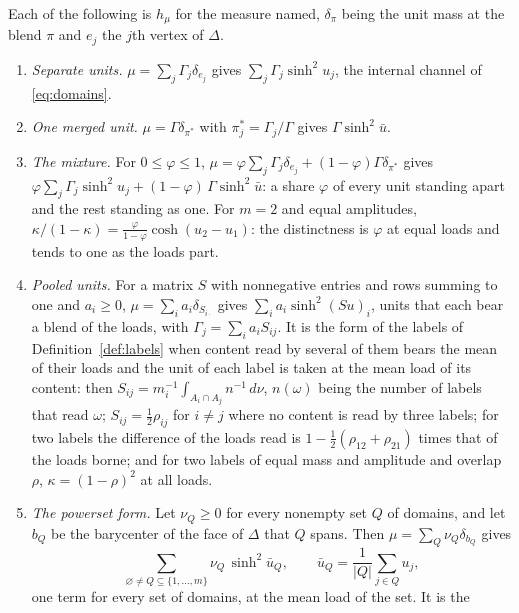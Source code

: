 \begin{proposition}\label{prop:forms}
Each of the following is $h_\mu$ for the measure named, $\delta_\pi$
being the unit mass at the blend $\pi$ and $e_j$ the $j$th vertex of
$\Delta$.
\begin{enumerate}[label=\emph{(\roman*)},itemsep=1pt]
\item \emph{Separate units.} $\mu=\sum_j\Gamma_j\delta_{e_j}$ gives
$\sum_j\Gamma_j\sinh^2u_j$, the internal channel of \eqref{eq:domains}.
\item \emph{One merged unit.} $\mu=\Gamma\delta_{\pi^\ast}$ with
$\pi^\ast_j=\Gamma_j/\Gamma$ gives $\Gamma\sinh^2\bar u$.
\item \emph{The mixture.} For $0\le\varphi\le1$,
$\mu=\varphi\sum_j\Gamma_j\delta_{e_j}+(1-\varphi)\Gamma\delta_{\pi^\ast}$
gives
$\varphi\sum_j\Gamma_j\sinh^2u_j+(1-\varphi)\,\Gamma\sinh^2\bar u$: a
share $\varphi$ of every unit standing apart and the rest standing as
one. For $m=2$ and equal amplitudes,
$\kappa/(1-\kappa)=\frac{\varphi}{1-\varphi}\cosh(u_2-u_1)$: the
distinctness is $\varphi$ at equal loads and tends to one as the loads
part.
\item \emph{Pooled units.} For a matrix $S$ with nonnegative entries and
rows summing to one and $a_i\ge0$, $\mu=\sum_ia_i\delta_{S_{i\cdot}}$
gives $\sum_ia_i\sinh^2(Su)_i$, units that each bear a blend of the
loads, with $\Gamma_j=\sum_ia_iS_{ij}$. It is the form of the labels of
Definition~\ref{def:labels} when content read by several of them bears
the mean of their loads and the unit of each label is taken at the mean
load of its content: then
$S_{ij}=m_i^{-1}\int_{A_i\cap A_j}n^{-1}\,d\nu$, $n(\omega)$ being the
number of labels that read $\omega$; $S_{ij}=\tfrac12\rho_{ij}$ for
$i\ne j$ where no content is read by three labels; for two labels the
difference of the loads read is $1-\tfrac12(\rho_{12}+\rho_{21})$ times
that of the loads borne; and for two labels of equal mass and amplitude
and overlap $\rho$, $\kappa=(1-\rho)^2$ at all loads.
\item \emph{The powerset form.} Let $\nu_Q\ge0$ for every nonempty set $Q$
of domains, and let $b_Q$ be the barycenter of the face of $\Delta$ that
$Q$ spans. Then $\mu=\sum_Q\nu_Q\delta_{b_Q}$ gives
\begin{equation}\label{eq:powerset}
\sum_{\varnothing\ne Q\subseteq\{1,\dots,m\}}\nu_Q\,\sinh^2\bar u_Q,
\qquad\bar u_Q=\frac1{|Q|}\sum_{j\in Q}u_j,
\end{equation}
one term for every set of domains, at the mean load of the set. It is the

\end{enumerate}
\end{proposition}
